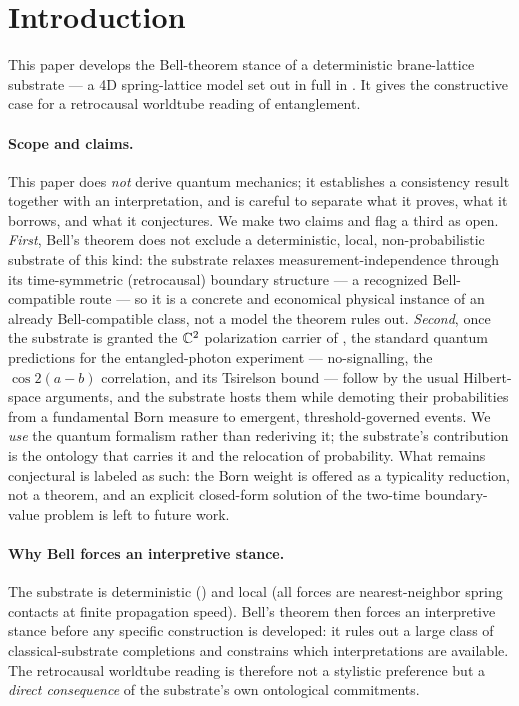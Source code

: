 \section{Introduction}
\label{sec:introduction}

This paper develops the Bell-theorem stance of a deterministic brane-lattice substrate --- a 4D
spring-lattice model set out in full in . It gives the constructive case for a
retrocausal worldtube reading of entanglement.

\paragraph{Scope and claims.}
This paper does \emph{not} derive quantum mechanics; it establishes a consistency result together
with an interpretation, and is careful to separate what it proves, what it borrows, and what it
conjectures. We make two claims and flag a third as open.
\emph{First}, Bell's theorem does not exclude a deterministic, local, non-probabilistic substrate
of this kind: the substrate relaxes measurement-independence through its time-symmetric
(retrocausal) boundary structure --- a recognized Bell-compatible route
\citep{WhartonArgaman2020,Sutherland2017,Aharonov2008TSVF} --- so it is a concrete and economical
physical instance of an already Bell-compatible class, not a model the theorem rules out.
\emph{Second}, once the substrate is granted the $\mathbb{C}^{2}$ polarization carrier of
, the standard quantum predictions for the entangled-photon experiment ---
no-signalling, the $\cos 2(a-b)$ correlation, and its Tsirelson bound --- follow by the usual
Hilbert-space arguments, and the substrate hosts them while demoting their probabilities from a
fundamental Born measure to emergent, threshold-governed events. We \emph{use} the quantum
formalism rather than rederiving it; the substrate's contribution is the ontology that carries it
and the relocation of probability.
What remains conjectural is labeled as such: the Born weight is offered as a typicality reduction,
not a theorem, and an explicit closed-form solution of the two-time boundary-value problem is left
to future work.

\paragraph{Why Bell forces an interpretive stance.}
The substrate is deterministic () and local (all forces are nearest-neighbor
spring contacts at finite propagation speed).
Bell's theorem then forces an interpretive stance before any specific construction is developed: it
rules out a large class of classical-substrate completions and constrains which interpretations
are available.
The retrocausal worldtube reading is therefore not a stylistic preference but a
\emph{direct consequence} of the substrate's own ontological commitments.

